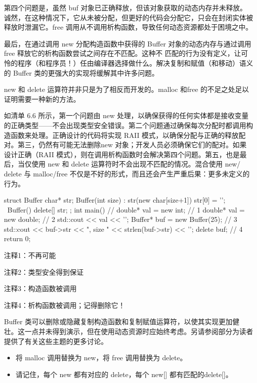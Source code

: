 第四个问题是，虽然 buf 对象已正确释放，但该对象获取的动态内存并未释放。诚然，在这种情况下，它从未被分配，但更好的代码会分配它，只会在封闭实体被释放时泄漏它。free 调用从不调用析构函数，导致任何动态资源都处于困境之中。

最后，在通过调用 new 分配构造函数中获得的 Buffer 对象的动态内存与通过调用 free 释放它的析构函数尝试之间存在不匹配。这种不 匹配的行为没有定义，让可怜的程序（和程序员！）任由编译器选择做什么。解决复制和赋值（和移动）语义的 Buffer 类的更强大的实现将缓解其中许多问题。


new 和 delete 运算符并非只是为了相反而开发的。malloc 和free 的不足之处足以证明需要一种新的方法。

如清单 6.6 所示，第一个问题由 new 处理，以确保获得的任何实体都是接收变量的正确类型——不会出现类型安全错误。第二个问题通过确保每次分配时都调用构造函数来处理。正确设计的代码将实现 RAII 模式，以确保分配与正确的释放配对。第三，仍然有可能无法删除new 对象；开发人员必须确保它们的配对。如果设计正确（RAII 模式），则在调用析构函数时会解决第四个问题。第五，也是最后，当仅使用 new 和 delete 运算符时不会出现不匹配的情况。混合使用 new/ delete 与 malloc/free 不仅是不好的形式，而且还会产生严重后果：更多未定义的行为。


\begin{cpp}
struct Buffer {
  char* str;
  Buffer(int size) : str(new char[size+1]) { str[0] = '\0'; }
  ~Buffer() { delete[] str; }
};
int main() {
  // double* val = new int; // 1
  double* val = new double; // 2
  std::cout << val << '\n';
  Buffer* buf = new Buffer(25); // 3
  std::cout << buf->str << ", size " << strlen(buf->str) << '\n';
  delete buf; // 4
  return 0;
}
\end{cpp}

{\footnotesize
注释1：不再可能

注释2：类型安全得到保证

注释3：构造函数被调用

注释4：析构函数被调用；记得删除它！
}

Buffer 类可以删除或隐藏复制构造函数和复制赋值运算符，以使其实现更加健壮。这一点并未得到演示，但在使用动态资源时应始终考虑。另请参阅部分为读者提供了有关这些主题的更多讨论。


\begin{itemize}
\item
将 malloc 调用替换为 new，将 free 调用替换为 delete。

\item
请记住，每个 new 都有对应的 delete，每个 new[] 都有匹配的delete[]。
\end{itemize}
